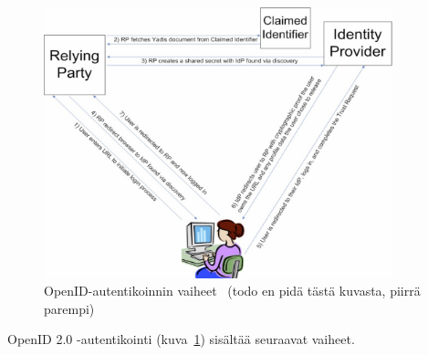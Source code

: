 \documentclass[finnish,gradu]{tktltiki}
\begin{document}
  \begin{figure}
    \centering
    \includegraphics[width=0.9\textwidth]{images/openid_flow_recordon06.jpg}
    \caption{OpenID-autentikoinnin vaiheet~\cite{openid_recordon_2009} (todo en pidä tästä kuvasta, piirrä parempi)}
    \label{fig:basic_openid_flow}
  \end{figure}

  OpenID 2.0 -autentikointi (kuva~\ref{fig:basic_openid_flow}) sisältää seuraavat vaiheet.
\end{document}

